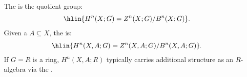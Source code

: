 \begin{definition} \label{definition:singular_cohomology_and_relative_singular_cohomology_of_topological_space_with_coefficients_in_an_abelian_group}
The  is the quotient group:
$$\hlin{H^n(X; G) = Z^n(X; G) / B^n(X; G)}.$$
Given a  $A \subseteq X$, the  is:
$$\hlin{H^n(X, A; G) = Z^n(X, A; G) / B^n(X, A; G)}.$$
If $G = R$ is a ring, $H^n(X, A; R)$ typically carries additional structure as an $R$-algebra via the .
\end{definition}